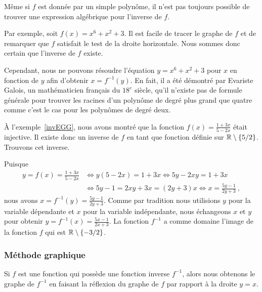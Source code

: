 {\begin{egg}
Même si $f$ est donnée par un simple polynôme, il n'est pas toujours
possible de trouver une expression algébrique pour l'inverse de $f$.

Par exemple, soit $f(x) = x^6 + x^2 + 3$.  Il est facile de tracer le
graphe de $f$ et de remarquer que $f$ satisfait le test de la droite
horizontale.  Nous sommes donc certain que l'inverse de $f$ existe.

Cependant, nous ne pouvons résoudre l'équation $y=x^6+x^2+3$ pour $x$
en fonction de $y$ afin d'obtenir $x = f^{-1}(y)$.  En fait, il a été
démontré par Evariste Galois, un mathématicien français du $18^e$
siècle, qu'il n'existe pas de formule générale pour trouver les
racines d'un polynôme de degré plus grand que quatre comme c'est le
cas pour les polynômes de degré deux.
\end{egg}

\begin{egg}
À l'exemple~\ref{invEGG}, nous avons montré que la fonction
$\displaystyle f(x) = \frac{1+3x}{5-2x}$ était injective.  Il existe
donc un inverse de $f$ en tant que fonction définie sur
$\mathbb{R}\setminus \{5/2\}$.  Trouvons cet inverse.

Puisque
\begin{align*}
y = f(x) = \frac{1+3x}{5-2x} &
\Leftrightarrow y(5-2x) = 1+3x \Leftrightarrow 5y -2xy = 1 + 3x \\
&\Leftrightarrow 5y -1 = 2xy + 3x = (2y+3)x
\Leftrightarrow x = \frac{5y -1}{2y+3} \ ,
\end{align*}
nous avons $\displaystyle x=f^{-1}(y) = \frac{5y -1}{2y+3}$.  Comme par
tradition nous utilisions $y$ pour la variable dépendante et $x$
pour la variable indépendante, nous échangeons $x$ et $y$ pour obtenir
$\displaystyle y=f^{-1}(x) = \frac{5x -1}{2x+3}$.  La fonction
$f^{-1}$ a comme domaine l'image de la fonction $f$ qui est
$\mathbb{R} \setminus \{-3/2\}$.
\end{egg}

\subsubsection{Méthode graphique}

\begin{meth}
Si $f$ est une fonction qui possède une fonction inverse $f^{-1}$,
alors nous obtenons le graphe de $f^{-1}$ en faisant la réflexion du
graphe de $f$ par rapport à la droite $y=x$.
\end{meth}

}
